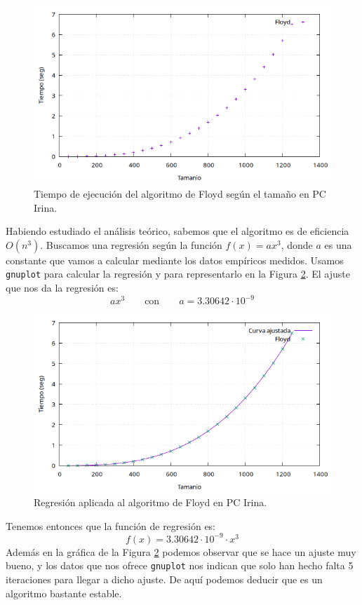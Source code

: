 \documentclass[12pt]{article}
\begin{document}
    \begin{figure}
        \centering
        \includegraphics[width=0.8\linewidth]{images/Floyd/floyd_puntos.png}
        \caption{Tiempo de ejecución del algoritmo de Floyd según el tamaño en PC Irina.}
        \label{fig:floyd_puntos}
    \end{figure}

    Habiendo estudiado el análisis teórico, sabemos que el algoritmo es de eficiencia $O(n^3)$. Buscamos una regresión según la función $f(x) = ax^3$, donde $a$ es una constante que vamos a calcular mediante los datos empíricos medidos. Usamos \verb|gnuplot| para calcular la regresión y para representarlo en la Figura \ref{fig:floyd_regresion}. El ajuste que nos da la regresión es:
    $$ax^3 \qquad \text{con} \qquad
         a = 3.30642 \cdot 10^{-9}$$

    \begin{figure}
        \centering
        \includegraphics[width=0.8\linewidth]{images/Floyd/floyd.png}
        \caption{Regresión aplicada al algoritmo de Floyd en PC Irina.}
        \label{fig:floyd_regresion}
    \end{figure}

    Tenemos entonces que la función de regresión es:
    \begin{equation*}
        f(x) = 3.30642 \cdot 10^{-9} \cdot x^3
    \end{equation*}
    Además en la gráfica de la Figura \ref{fig:floyd_regresion} podemos observar que se hace un ajuste muy bueno, y los datos que nos ofrece \verb|gnuplot| nos indican que solo han hecho falta 5 iteraciones para llegar a dicho ajuste. De aquí podemos deducir que es un algoritmo bastante estable. 
\end{document}
